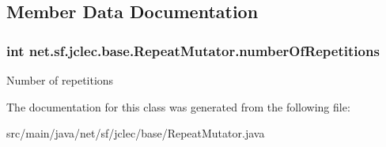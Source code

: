 \subsection{Member Data Documentation}
\hypertarget{classnet_1_1sf_1_1jclec_1_1base_1_1_repeat_mutator_ac345474a416c54c2c28280626c620691}{
\subsubsection[{number\-Of\-Repetitions}]{\setlength{\rightskip}{0pt plus 5cm}int net.\-sf.\-jclec.\-base.\-Repeat\-Mutator.\-number\-Of\-Repetitions\hspace{0.3cm}{\ttfamily [protected]}}}\label{classnet_1_1sf_1_1jclec_1_1base_1_1_repeat_mutator_ac345474a416c54c2c28280626c620691}
Number of repetitions 

The documentation for this class was generated from the following file\-:\begin{DoxyCompactItemize}
\item 
src/main/java/net/sf/jclec/base/Repeat\-Mutator.\-java\end{DoxyCompactItemize}

